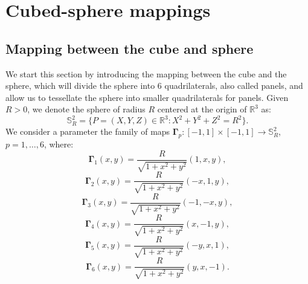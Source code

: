 \newpage
\section{Cubed-sphere mappings}
\label{cs-mappings}
\subsection{Mapping between the cube and sphere}
\label{equidistant-cs}
We start this section by introducing the mapping between the cube and the sphere, which will divide the sphere into 6 quadrilaterals, also called panels, and allow us to tessellate the sphere into smaller quadrilaterals for panels.
Given $R>0$, we denote the sphere of radius $R$ 
centered at the origin of  $\mathbb{R}^3$ as:
\begin{equation*}
	\mathbb{S}^2_R = \{ P = (X,Y,Z) \in \mathbb{R}^3: X^2 + Y^2 + Z^2 = R^2\}.
\end{equation*}
We consider a parameter %
the family of maps
$\boldsymbol{\Gamma}_{p}: [-1,1] \times [-1,1] \to \mathbb{S}^2_R$, $p=1, \ldots, 6$,
where:
\begin{equation*}
	\boldsymbol{\Gamma}_{1}(x,y) = \frac{R}{\sqrt{1 + x^2 + y^2}}(1, x, y), 
\end{equation*}
\begin{equation*}
	\boldsymbol{\Gamma}_{2}(x,y) = \frac{R}{\sqrt{1 + x^2 + y^2}}(-x, 1, y), 
\end{equation*}
\begin{equation*}
	\boldsymbol{\Gamma}_{3}(x,y) = \frac{R}{\sqrt{1 + x^2 + y^2}}(-1, -x, y), 
\end{equation*}
\begin{equation*}
	\boldsymbol{\Gamma}_{4}(x,y) = \frac{R}{\sqrt{1 + x^2 + y^2}}(x, -1, y), 
\end{equation*}
\begin{equation*}
	\boldsymbol{\Gamma}_{5}(x,y) = \frac{R}{\sqrt{1 + x^2 + y^2}}(-y, x, 1), 
\end{equation*}
\begin{equation*}
	\boldsymbol{\Gamma}_{6}(x,y) = \frac{R}{\sqrt{1 + x^2 + y^2}}(y, x, -1).
\end{equation*}


